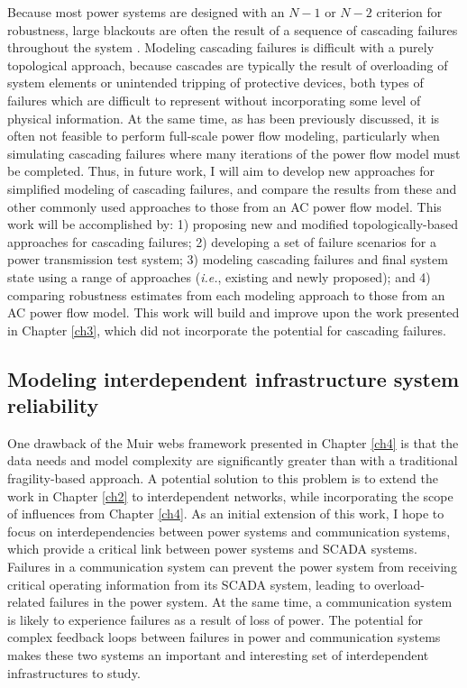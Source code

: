 Because most power systems are designed with an $N-1$ or $N-2$ criterion for robustness, large blackouts are often the result of a sequence of cascading failures throughout the system \cite{Baldick2009}. Modeling cascading failures is difficult with a purely topological approach, because cascades are typically the result of overloading of system elements or unintended tripping of protective devices, both types of failures which are difficult to represent without incorporating some level of physical information. At the same time, as has been previously discussed, it is often not feasible to perform full-scale power flow modeling, particularly when simulating cascading failures where many iterations of the power flow model must be completed. Thus, in future work, I will aim to develop new approaches for simplified modeling of cascading failures, and compare the results from these and other commonly used approaches to those from an AC power flow model. This work will be accomplished by: 1) proposing new and modified topologically-based approaches for cascading failures; 2) developing a set of failure scenarios for a power transmission test system; 3) modeling cascading failures and final system state using a range of approaches (\emph{i.e.}, existing and newly proposed); and 4) comparing robustness estimates from each modeling approach to those from an AC power flow model.  This work will build and improve upon the work presented in Chapter \ref{ch3}, which did not incorporate the potential for cascading failures.

\subsection{Modeling interdependent infrastructure system reliability}
\label{sec:ch5:future:interdependence}

One drawback of the Muir webs framework presented in Chapter \ref{ch4} is that the data needs and model complexity are significantly greater than with a traditional fragility-based approach. A potential solution to this problem is to extend the work in Chapter \ref{ch2} to interdependent networks, while incorporating the scope of influences from Chapter \ref{ch4}.  As an initial extension of this work, I hope to focus on interdependencies between power systems and communication systems, which provide a critical link between power systems and SCADA systems. Failures in a communication system can prevent the power system from receiving critical operating information from its SCADA system, leading to overload-related failures in the power system.  At the same time, a communication system is likely to experience failures as a result of loss of power.  The potential for complex feedback loops between failures in power and communication systems makes these two systems an important and interesting set of interdependent infrastructures to study.

